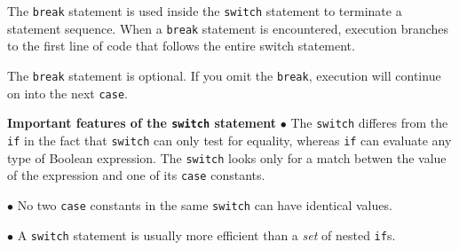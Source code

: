 \vskip 1mm
The {\tt break} statement is used inside the {\tt switch} statement to terminate a statement sequence. When a {\tt break} statement is encountered, execution branches to the first line of code that follows the entire switch statement.

\vskip 1mm
The {\tt break} statement is optional. If you omit the {\tt break}, execution will continue on into the next {\tt case}.

\vskip 1cm
\filbreak
{\bf Important features of the {\tt switch} statement}
\vskip 1mm
\qquad$\bullet$ The {\tt switch} differes from the {\tt if} in the fact that {\tt switch} can only test for equality, whereas {\tt if}
\vskip 1mm
\qquad\quad can evaluate any type of Boolean expression. The {\tt switch} looks only for a match betwen the
\vskip 1mm
\qquad\quad value of the expression and one of its {\tt case} constants.

\vskip 2mm
\qquad$\bullet$ No two {\tt case} constants in the same {\tt switch} can have identical values.

\vskip 2mm
\qquad$\bullet$ A {\tt switch} statement is usually more efficient than a {\it set} of nested {\tt if}s.
\filbreak
\vfill\eject
\bye
